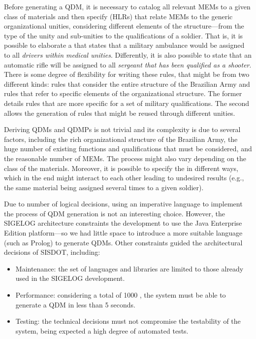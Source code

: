 Before generating a QDM, it is necessary to catalog all relevant MEMs to a given 
class of materials and then specify \callers (HLRs) that relate MEMs to the generic organizational 
unities, considering different elements of the structure---from the type of the unity and 
sub-unities to the qualifications of a soldier. That is, it is possible to elaborate a 
\shc that states that a military ambulance would be assigned to all \emph{drivers within medical unities}. 
Differently, it is also possible to state that an automatic rifle will be assigned to all \emph{sergeant that has 
been qualified as a shooter}. There is some degree of flexibility for writing these 
rules, that might be from two different kinds: rules that consider the entire structure 
of the Brazilian Army and rules that refer to specific elements of the organizational 
structure. The former details rules that are more specific for a set of military qualifications. The second allows 
the generation of rules that might be reused through different unities. 

Deriving QDMs and QDMPs is not trivial and its complexity is due to several 
factors, including the rich organizational structure of the Brazilian Army, 
the huge number of existing functions and qualifications that must be 
considered, and the reasonable number of MEMs. The process might also vary 
depending on the class of the materials. Moreover, it is possible to specify the  
\callers in different ways, which in the end might interact to each other leading 
to undesired results (e.g., the same material being assigned several times 
to a given soldier). 

Due to number of logical decisions, using an imperative language to implement the process of QDM generation 
is not an interesting choice. However, the SIGELOG architecture constraints the development 
to use the Java Enterprise Edition platform---so we had little space to introduce a 
more suitable language (such as Prolog) to generate QDMs. Other constraints guided 
the architectural decisions of SISDOT, including:  

\begin{itemize}
\item Maintenance: the set of languages and libraries are limited to those already used in the SIGELOG development.  
\item Performance: considering a total of 1000 \callers, the system must be able to generate a QDM in less than 5 seconds.
\item Testing: the technical decisions must not compromise the testability of the system, being expected a high degree of automated tests. 
\end{itemize}

